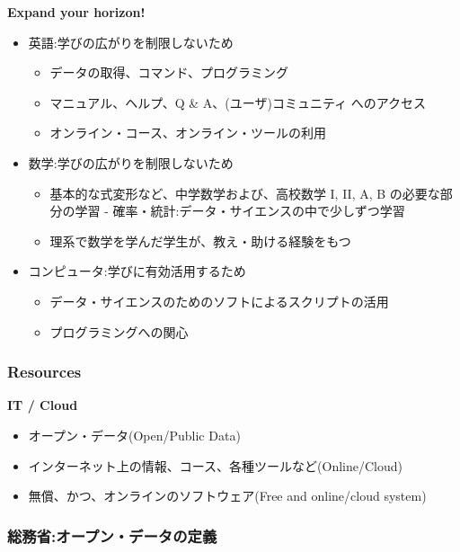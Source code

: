 \documentclass[
]{book}
\providecommand{\tightlist}{%
  \setlength{\itemsep}{0pt}\setlength{\parskip}{0pt}}
\theoremstyle{definition}
\theoremstyle{definition}
\theoremstyle{definition}
\theoremstyle{definition}
\theoremstyle{remark}
\begin{document}
\textbf{Expand your horizon!}

\begin{itemize}
\tightlist
\item
  英語:学びの広がりを制限しないため

  \begin{itemize}
  \tightlist
  \item
    データの取得、コマンド、プログラミング
  \item
    マニュアル、ヘルプ、Q \& A、(ユーザ)コミュニティ へのアクセス\\
  \item
    オンライン・コース、オンライン・ツールの利用
  \end{itemize}
\item
  数学:学びの広がりを制限しないため

  \begin{itemize}
  \tightlist
  \item
    基本的な式変形など、中学数学および、高校数学 I, II, A, B の必要な部分の学習 - 確率・統計:データ・サイエンスの中で少しずつ学習
  \item
    理系で数学を学んだ学生が、教え・助ける経験をもつ
  \end{itemize}
\item
  コンピュータ:学びに有効活用するため

  \begin{itemize}
  \tightlist
  \item
    データ・サイエンスのためのソフトによるスクリプトの活用
  \item
    プログラミングへの関心
  \end{itemize}
\end{itemize}

\hypertarget{resources}{%
\subsubsection{Resources}\label{resources}}

\textbf{IT / Cloud}

\begin{itemize}
\tightlist
\item
  オープン・データ(Open/Public Data)
\item
  インターネット上の情報、コース、各種ツールなど(Online/Cloud)
\item
  無償、かつ、オンラインのソフトウェア(Free and online/cloud system)
\end{itemize}

\hypertarget{ux7dcfux52d9ux7701ux30aaux30fcux30d7ux30f3ux30c7ux30fcux30bfux306eux5b9aux7fa9}{%
\subsubsection{総務省:オープン・データの定義}\label{ux7dcfux52d9ux7701ux30aaux30fcux30d7ux30f3ux30c7ux30fcux30bfux306eux5b9aux7fa9}}
\end{document}
